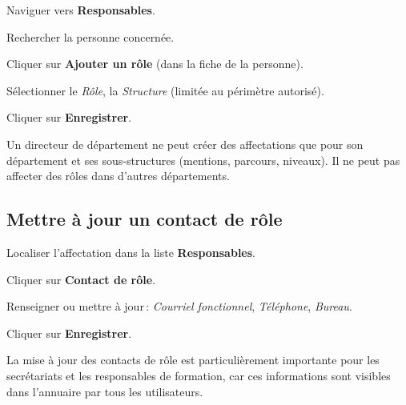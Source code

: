 \begin{steps}
  \item Naviguer vers \textbf{Responsables}.
  \item Rechercher la personne concern\'ee.
  \item Cliquer sur \textbf{Ajouter un r\^ole} (dans la fiche de la personne).
  \item S\'electionner le \textit{R\^ole}, la \textit{Structure} (limit\'ee au p\'erim\`etre autoris\'e).
  \item Cliquer sur \textbf{Enregistrer}.
\end{steps}

\begin{notebox}
  Un directeur de d\'epartement ne peut cr\'eer des affectations que pour son d\'epartement et ses sous-structures (mentions, parcours, niveaux). Il ne peut pas affecter des r\^oles dans d'autres d\'epartements.
\end{notebox}


\subsection{Mettre \`a jour un contact de r\^ole}

\begin{steps}
  \item Localiser l'affectation dans la liste \textbf{Responsables}.
  \item Cliquer sur \textbf{Contact de r\^ole}.
  \item Renseigner ou mettre \`a jour\,: \textit{Courriel fonctionnel}, \textit{T\'el\'ephone}, \textit{Bureau}.
  \item Cliquer sur \textbf{Enregistrer}.
\end{steps}

\begin{tipbox}
  La mise \`a jour des contacts de r\^ole est particuli\`erement importante pour les secr\'etariats et les responsables de formation, car ces informations sont visibles dans l'annuaire par tous les utilisateurs.
\end{tipbox}


